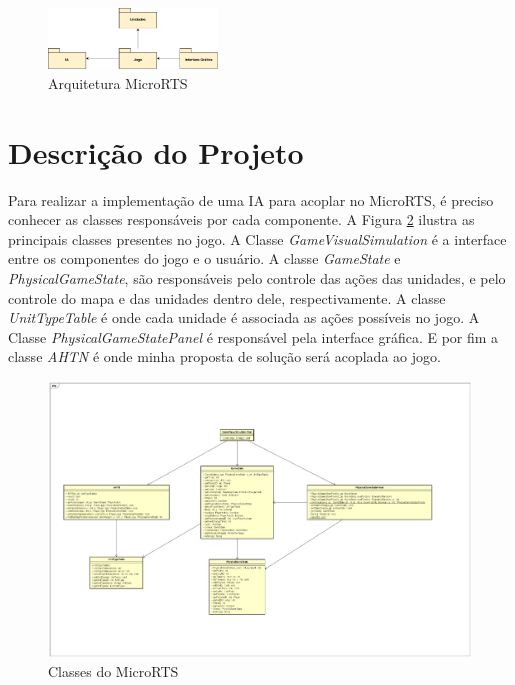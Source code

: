  \begin{figure}[ht]
 	\centering
 	\includegraphics[width=0.4\textwidth]{fig/pacotes.pdf}
 	\caption{Arquitetura MicroRTS}
 	\label{fig:pacotes}
 \end{figure} 
 
\section{Descrição do Projeto}
 

Para realizar a implementação de uma IA para acoplar no MicroRTS, é preciso conhecer as classes responsáveis por cada componente. A Figura \ref{fig:classes} ilustra as principais classes presentes no jogo. A Classe \textit{GameVisualSimulation} é a interface entre os componentes do jogo e o usuário. A classe \textit{GameState} e \textit{PhysicalGameState}, são responsáveis pelo controle das ações das unidades, e pelo controle do mapa e das unidades dentro dele, respectivamente. A classe \textit{UnitTypeTable} é onde cada unidade é associada as ações possíveis no jogo. A Classe \textit{PhysicalGameStatePanel} é responsável pela interface gráfica. E por fim a classe \textit{AHTN} é onde minha proposta de solução será acoplada ao jogo.
 
  \begin{figure}[ht]
  	\centering
  	\includegraphics[width=1\textwidth]{fig/classes.pdf}
  	\caption{Classes do MicroRTS}
  	\label{fig:classes}
  \end{figure} 

